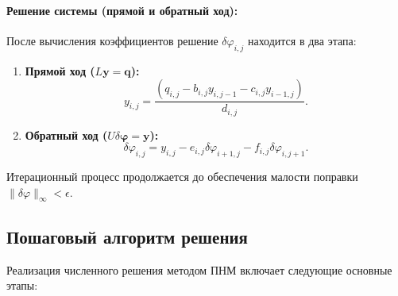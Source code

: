 \documentclass[a4paper,12pt]{article}
\begin{document}
	\paragraph{Решение системы (прямой и обратный ход):}
	После вычисления коэффициентов решение $\delta \varphi_{i,j}$ находится в два этапа:
	\begin{enumerate}
		\item \textbf{Прямой ход ($L\mathbf{y} = \mathbf{q}$):}
		\[ y_{i,j} = \frac{(q_{i,j} - b_{i,j} y_{i,j-1} - c_{i,j} y_{i-1,j})}{d_{i,j}}  . \]
		\item \textbf{Обратный ход ($U \delta \boldsymbol{\varphi} = \mathbf{y}$):}
		\[ \delta \varphi_{i,j} = y_{i,j} - e_{i,j} \delta \varphi_{i+1,j} - f_{i,j} \delta \varphi_{i,j+1}. \]
	\end{enumerate}
	
	Итерационный процесс продолжается до обеспечения малости поправки $\|\delta \varphi\|_\infty < \epsilon$. 
	
	\subsection{Пошаговый алгоритм решения}
	
	Реализация численного решения методом ПНМ включает следующие основные этапы:
	
\end{document}
